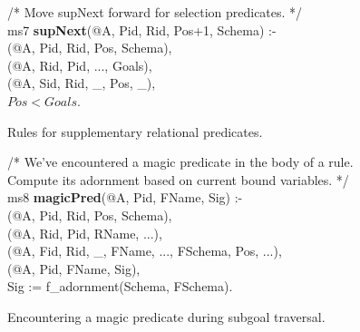 \begin{figure}[!t]
\begin{boxedminipage}{\linewidth}
/* Move supNext forward for selection predicates. */ \\
ms7 {\bf supNext}(@A, Pid, Rid, Pos+1, Schema) :- \\
(@A, Pid, Rid, Pos, Schema), \\
(@A, Rid, Pid, ..., Goals), \\
(@A, Sid, Rid, \_, Pos, \_), \\
\datalogspace $Pos < Goals$. 
\end{boxedminipage}
\caption{\label{ch:evita:fig:suppred}Rules for supplementary relational predicates.}
\end{figure}


\begin{figure}[!t]
\ssp
\centering
\begin{boxedminipage}{\linewidth}
/* We've encountered a magic predicate in the body of a rule. \\
   Compute its adornment based on current bound variables. */ \\
ms8 {\bf magicPred}(@A, Pid, FName, Sig) :- \\
(@A, Pid, Rid, Pos, Schema), \\
(@A, Rid, Pid, RName, ...), \\
(@A, Fid, Rid, \_, FName, ..., FSchema, Pos, ...), \\
(@A, Pid, FName, Sig), \\
\datalogspace Sig := f\_adornment(Schema, FSchema).

\end{boxedminipage}
\caption{\label{ch:evita:fig:mpgoal}Encountering a magic predicate during subgoal traversal.}
\end{figure}

